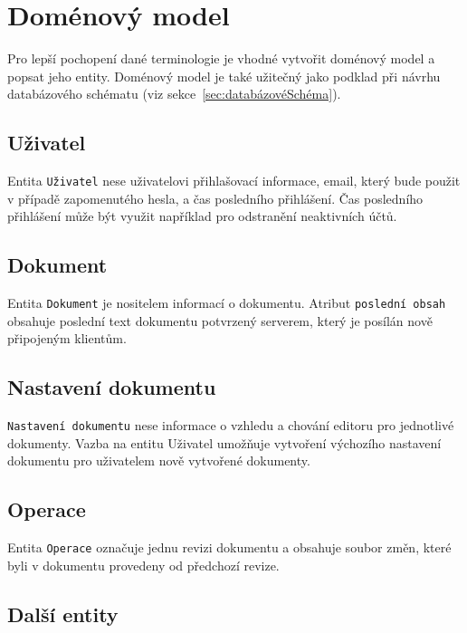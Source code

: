 \section{Doménový model}\label{sec:domenovyModel}

Pro lepší pochopení dané terminologie je vhodné vytvořit doménový model a popsat jeho entity.
Doménový model je také užitečný jako podklad při návrhu databázového schématu (viz sekce~\ref{sec:databázovéSchéma}).

\subsection{Uživatel}\label{subsec:uživatel}

Entita \texttt{Uživatel} nese uživatelovi přihlašovací informace, email, který bude použit v případě zapomenutého hesla, a čas posledního přihlášení.
Čas posledního přihlášení může být využit například pro odstranění neaktivních účtů.

\subsection{Dokument}\label{subsec:dokument}

Entita \texttt{Dokument} je nositelem informací o dokumentu.
Atribut \texttt{poslední obsah} obsahuje poslední text dokumentu potvrzený serverem, který je posílán nově připojeným klientům.

\subsection{Nastavení dokumentu}\label{subsec:nastaveníDokumentu}

\texttt{Nastavení dokumentu} nese informace o vzhledu a chování editoru pro jednotlivé dokumenty.
Vazba na entitu Uživatel umožňuje vytvoření výchozího nastavení dokumentu pro uživatelem nově vytvořené dokumenty.

\subsection{Operace}\label{subsec:operace}

Entita \texttt{Operace} označuje jednu revizi dokumentu a obsahuje soubor změn, které byli v dokumentu provedeny od předchozí revize.

\subsection{Další entity}\label{subsec:dalšíEntity}

